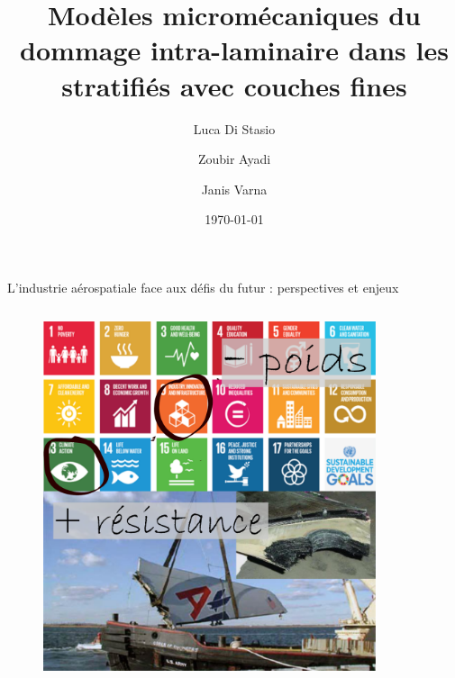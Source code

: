 \documentclass[final]{beamer}
\title{Mod\`eles microm\'ecaniques du dommage intra-laminaire dans les stratifi\'es avec couches fines}
\author{Luca Di Stasio \inst{1,2} \and Zoubir Ayadi \inst{1} \and Janis Varna \inst{2}}
\date{\today}
\begin{document}
\begin{frame}

\begin{center}
\vspace{20pt}
\begin{minipage}{\textwidth}
\begin{block}{\rule[-0.6ex]{0pt}{50pt}\centering\LARGE L'industrie a\'erospatiale face aux d\'efis du futur : perspectives et enjeux}
\vspace{1cm}
\begin{columns}
\begin{column}{0.375\textwidth}
  \begin{center}
\captionsetup[subfigure]{labelformat=empty}
\begin{figure}[!h]
\centering
\includegraphics[width=0.9\columnwidth]{intro.pdf}
\end{figure}
\end{center}
\end{column}
\begin{column}{0.325\textwidth}  %
  \begin{center}
\captionsetup[subfigure]{labelformat=empty}
\begin{figure}[!h]
\centering

\end{figure}
\end{center}
\end{column}
\end{columns}
\end{block}
\end{minipage}
\end{center}
\end{frame}
\end{document}
